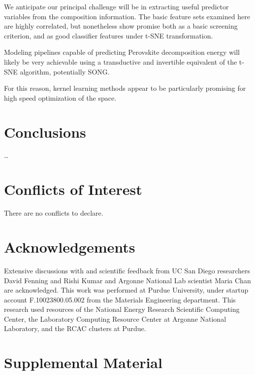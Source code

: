 \documentclass[twoside, twocolumn, 9pt, draft]{article}
\begin{document}
We anticipate our principal challenge will be in extracting useful
predictor variables from the composition information. The basic
feature sets examined here are highly correlated, but nonetheless show
promise both as a basic screening criterion, and as good classifier
features under t-SNE transformation.

Modeling pipelines capable of predicting Perovskite decomposition
energy will likely be very achievable using a transductive and
invertible equivalent of the t-SNE algorithm, potentially SONG.

For this reason, kernel learning methods appear to be particularly
promising for high speed optimization of the space.

\section*{Conclusions}
\label{sec:orgeb2f477}
\ldots{}\\

\section*{Conflicts of Interest}
\label{sec:orgc821cc1}
There are no conflicts to declare.

\section*{Acknowledgements}
\label{sec:org293500f}
Extensive discussions with and scientific feedback from UC San Diego
researchers David Fenning and Rishi Kumar and Argonne National Lab
scientist Maria Chan are acknowledged. This work was performed at Purdue
University, under startup account F.10023800.05.002 from the Materials
Engineering department. This research used resources of the National
Energy Research Scientific Computing Center, the Laboratory Computing
Resource Center at Argonne National Laboratory, and the RCAC clusters at
Purdue.



\section*{Supplemental Material}
\label{sec:org68e2221}
\printglossaries
\end{document}
